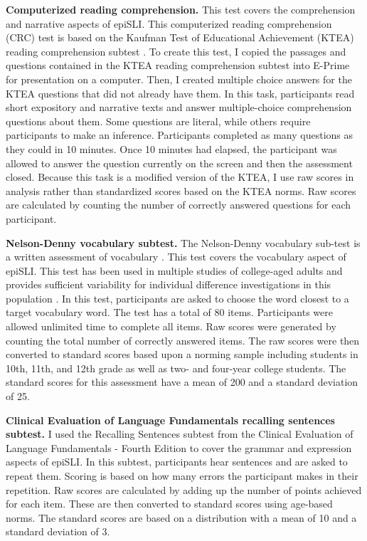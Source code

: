 \documentclass[../dissertation.tex]{subfiles}
\begin{document}
	\textbf{Computerized reading comprehension.} This test covers the comprehension and narrative aspects of epiSLI. This computerized reading comprehension (CRC) test is based on the Kaufman Test of Educational Achievement (KTEA) reading comprehension subtest \citep{Kaufman2004}. To create this test, I copied the passages and questions contained in the KTEA reading comprehension subtest into E-Prime \citep{schneider2002prime} for presentation on a computer. Then, I created multiple choice answers for the KTEA questions that did not already have them. In this task, participants read short expository and narrative texts and answer multiple-choice comprehension questions about them. Some questions are literal, while others require participants to make an inference. Participants completed as many questions as they could in 10 minutes. Once 10 minutes had elapsed, the participant was allowed to answer the question currently on the screen and then the assessment closed. Because this task is a modified version of the KTEA, I use raw scores in analysis rather than standardized scores based on the KTEA norms. Raw scores are calculated by counting the number of correctly answered questions for each participant.  \par
	\textbf{Nelson-Denny vocabulary subtest.} The Nelson-Denny vocabulary sub-test is a written assessment of vocabulary \citep{Brown1981}. This test covers the vocabulary aspect of epiSLI. This test has been used in multiple studies of college-aged adults and provides sufficient variability for individual difference investigations in this population \citetext{e.g., \citealt{Boudewyn2015}; \citealt{Stafura2014}}. In this test, participants are asked to choose the word closest to a target vocabulary word. The test has a total of 80 items. Participants were allowed unlimited time to complete all items. Raw scores were generated by counting the total number of correctly answered items. The raw scores were then converted to standard scores based upon a norming sample including students in 10th, 11th, and 12th grade as well as two- and four-year college students. The standard scores for this assessment have a mean of 200 and a standard deviation of 25. \par
	\textbf{Clinical Evaluation of Language Fundamentals recalling sentences subtest.} I used the Recalling Sentences subtest from the Clinical Evaluation of Language Fundamentals - Fourth Edition \citetext{CELF; \citealt{Semel2006}} to cover the grammar and expression aspects of epiSLI. In this subtest, participants hear sentences and are asked to repeat them. Scoring is based on how many errors the participant makes in their repetition. Raw scores are calculated by adding up the number of points achieved for each item. These are then converted to standard scores using age-based norms. The standard scores are based on a distribution with a mean of 10 and a standard deviation of 3. \par
\end{document}
